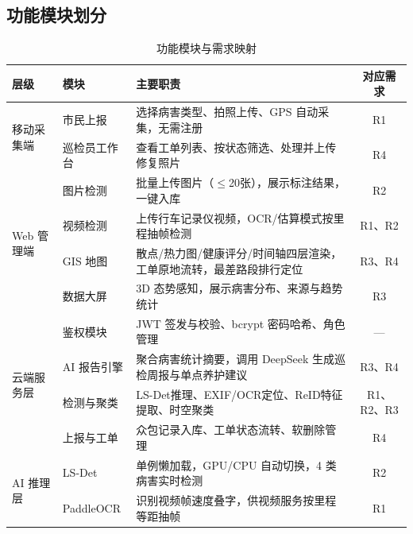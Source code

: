\documentclass[UTF8, a4paper, fontset=ubuntu]{ctexart}
\begin{document}
  \subsection{功能模块划分}

  \begin{table}[H]
  \centering
  \caption{功能模块与需求映射}
  \label{tab:modules}
  \begin{tabular}{lllc}
  \toprule
  层级 & 模块 & 主要职责 & 对应需求 \\
  \midrule
  \multirow{2}{*}{移动采集端}
    & 市民上报     & 选择病害类型、拍照上传、GPS 自动采集，无需注册   & R1 \\
    & 巡检员工作台 & 查看工单列表、按状态筛选、处理并上传修复照片     & R4 \\
  \midrule
  \multirow{4}{*}{Web 管理端}
    & 图片检测 & 批量上传图片（$\leq$20张），展示标注结果，一键入库 & R2 \\
    & 视频检测 & 上传行车记录仪视频，OCR/估算模式按里程抽帧检测   & R1、R2 \\
    & GIS 地图 & 散点/热力图/健康评分/时间轴四层渲染，工单原地流转，最差路段排行定位   & R3、R4 \\
    & 数据大屏 & 3D 态势感知，展示病害分布、来源与趋势统计        & R3 \\
  \midrule
  \multirow{4}{*}{云端服务层}
    & 鉴权模块   & JWT 签发与校验、bcrypt 密码哈希、角色管理            & --- \\
    & AI 报告引擎 & 聚合病害统计摘要，调用 DeepSeek \cite{deepseekv3}生成巡检周报与单点养护建议 & R3、R4 \\
    & 检测与聚类 & LS-Det推理、EXIF/OCR定位、ReID特征提取、时空聚类  & R1、R2、R3 \\
    & 上报与工单 & 众包记录入库、工单状态流转、软删除管理               & R4 \\
  \midrule
  \multirow{2}{*}{AI 推理层}
    & LS-Det & 单例懒加载，GPU/CPU 自动切换，4 类病害实时检测 & R2 \\
    & PaddleOCR & 识别视频帧速度叠字，供视频服务按里程等距抽帧   & R1 \\
  \bottomrule
  \end{tabular}
  \end{table}
\end{document}
